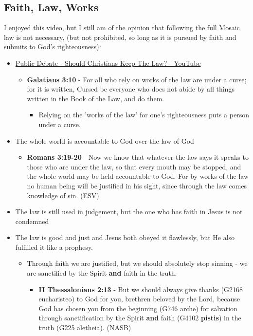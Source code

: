 \documentclass[11pt]{article}
\begin{document}
\subsection{Faith, Law, Works}
\label{sec:org4d6abb7}
I enjoyed this video, but I still am of the opinion that following the full Mosaic law is not necessary, (but not prohibited, so long as it is pursued by faith and submits to God's righteousness):
\begin{itemize}
\item \href{https://www.youtube.com/watch?v=CNHKqhwu6Bo}{Public Debate - Should Christians Keep The Law? - YouTube}
\begin{itemize}
\item \textbf{Galatians 3:10} - For all who rely on works of the law are under a curse; for it is written, Cursed be everyone who does not abide by all things written in the Book of the Law, and do them.
\begin{itemize}
\item Relying on the 'works of the law' for one's righteousness puts a person under a curse.
\end{itemize}
\end{itemize}
\item The whole world is accountable to God over the law of God
\begin{itemize}
\item \textbf{Romans 3:19-20} - Now we know that whatever the law says it speaks to those who are under the law, so that every mouth may be stopped, and the whole world may be held accountable to God. For by works of the law no human being will be justified in his sight, since through the law comes knowledge of sin. (ESV)
\end{itemize}
\item The law is still used in judgement, but the one who has faith in Jesus is not condemned
\item The law is good and just and Jesus both obeyed it flawlessly, but He also fulfilled it like a prophesy.
\begin{itemize}
\item Through faith we are justified, but we should absolutely stop sinning - we are sanctified by the Spirit \textbf{and} faith in the truth.
\begin{itemize}
\item \textbf{II Thessalonians 2:13} - But we should always give thanks (G2168 eucharisteo) to God for you, brethren beloved by the Lord, because God has chosen you from the beginning (G746 arche) for salvation through sanctification by the Spirit \textbf{and} faith (G4102 \textbf{pistis}) in the truth (G225 aletheia). (NASB)

\end{itemize}
\end{itemize}
\end{itemize}
\end{document}
